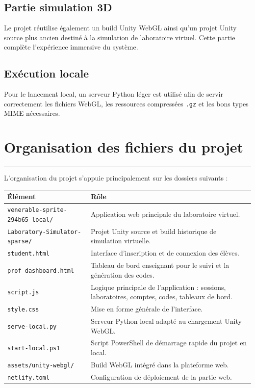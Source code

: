 \documentclass[12pt,a4paper]{report}
\newcommand{\sectionline}{
  \vspace{0.3em}
  \noindent\color{mainline}\rule{\textwidth}{1.5pt}
  \vspace{0.6em}
}
\begin{document}
\subsection{Partie simulation 3D}

Le projet réutilise également un build Unity WebGL ainsi qu'un projet Unity source plus ancien
destiné à la simulation de laboratoire virtuel. Cette partie complète l'expérience immersive
du système.

\subsection{Exécution locale}

Pour le lancement local, un serveur Python léger est utilisé afin de servir correctement les
fichiers WebGL, les ressources compressées \texttt{.gz} et les bons types MIME nécessaires.

\section{Organisation des fichiers du projet}

\sectionline

L'organisation du projet s'appuie principalement sur les dossiers suivants :

\begin{longtable}{|p{4cm}|p{10cm}|}
\hline
\rowcolor{softgray}
\textbf{Élément} & \textbf{Rôle} \\
\hline
\texttt{venerable-sprite-294b65-local/} & Application web principale du laboratoire virtuel. \\
\hline
\texttt{Laboratory-Simulator-sparse/} & Projet Unity source et build historique de simulation virtuelle. \\
\hline
\texttt{student.html} & Interface d'inscription et de connexion des élèves. \\
\hline
\texttt{prof-dashboard.html} & Tableau de bord enseignant pour le suivi et la génération des codes. \\
\hline
\texttt{script.js} & Logique principale de l'application : sessions, laboratoires, comptes, codes, tableaux de bord. \\
\hline
\texttt{style.css} & Mise en forme générale de l'interface. \\
\hline
\texttt{serve-local.py} & Serveur Python local adapté au chargement Unity WebGL. \\
\hline
\texttt{start-local.ps1} & Script PowerShell de démarrage rapide du projet en local. \\
\hline
\texttt{assets/unity-webgl/} & Build WebGL intégré dans la plateforme web. \\
\hline
\texttt{netlify.toml} & Configuration de déploiement de la partie web. \\
\hline
\end{longtable}
\end{document}
